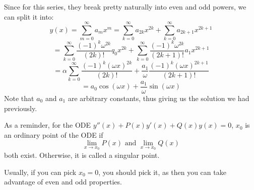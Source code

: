 \documentclass[../main/main.tex]{subfiles}
\begin{document}
Since for this series, they break pretty naturally into even and odd powers, we can split it into: \[
	y(x) = \sum_{m=0}^{\infty} a_mx^{m}= \sum_{k=0}^{\infty} a_{2k}x^{2k}+\sum_{k=0}^{\infty} a_{2k+1}x^{2k+1}
\] \[
= \sum_{k=0}^{\infty} \frac{(-1)^{k}\omega^{2k}}{(2k)!}q_0 x^{2k}+ \sum_{k=0}^{\infty} \frac{(-1)^{k}\omega^{2k}}{(2k+1)!}a_1x^{2k+1}
\] \[
= \alpha \sum_{k=0}^{\infty} \frac{(-1)^{k}(\omega x)^{2k}}{(2k)!}+ \frac{a_1}{\omega} \frac{(-1)^{k}(\omega x)^{2k+1}}{(2k+1)!}
\] \[
= a_0 \cos(\omega x) + \frac{a_1}{\omega}\sin(\omega x)
\] Note that $a_0$ and $a_1$ are arbitrary constants, thus giving us the solution we had previously.
\begin{remark}
	As a reminder, for the ODE $y''(x)+P(x)y'(x) + Q(x)y(x)=0$,  $x_0$ is an ordinary point of the ODE if \[
		\lim\limits_{x \to x_0} P(x) \text{ and }\lim\limits_{x \to x_0} Q(x)
	\] both exist. Otherwise, it is called a singular point.
\end{remark}
\begin{remark}
	Usually, if you can pick $x_0=0$, you should pick it, as then you can take advantage of even and odd properties.
\end{remark}
\end{document}
